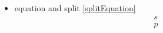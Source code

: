 \documentclass{article}
\begin{document}
\begin{itemize}
		\item equation and split \ref{splitEquation} \begin{equation} \label{splitEquation}\begin{split} s \\ p \end{split} \end{equation}
	\end{itemize}
\end{document}
